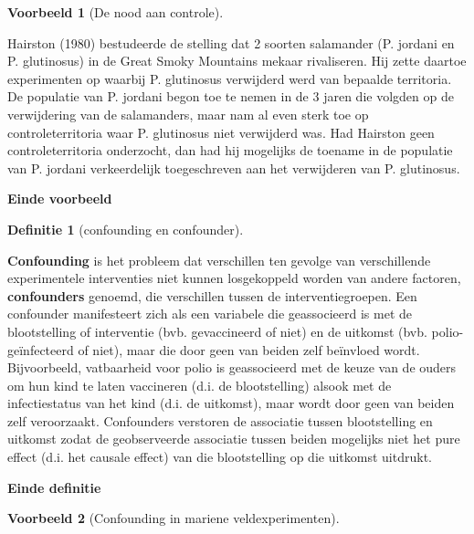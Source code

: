 \documentclass[
  12pt,dutch]{book}
\theoremstyle{definition}
\newtheorem{definition}{Definitie}[chapter]
\theoremstyle{definition}
\newtheorem{example}{Voorbeeld}[chapter]
\theoremstyle{definition}
\theoremstyle{definition}
\theoremstyle{remark}
\begin{document}
\begin{example}[De nood aan controle]
\protect\hypertarget{exm:unnamed-chunk-66}{}\label{exm:unnamed-chunk-66}~
\end{example}

Hairston (1980) bestudeerde de stelling dat 2 soorten salamander (P. jordani en P. glutinosus) in de Great Smoky Mountains mekaar rivaliseren. Hij zette daartoe experimenten op waarbij P. glutinosus verwijderd werd van bepaalde territoria. De populatie van P. jordani begon toe te nemen in de 3 jaren die volgden op de verwijdering van de salamanders, maar nam al even sterk toe op controleterritoria waar P. glutinosus niet verwijderd was. Had Hairston geen controleterritoria onderzocht, dan had hij mogelijks de toename in de populatie van P. jordani verkeerdelijk toegeschreven aan het verwijderen van P. glutinosus.

\textbf{Einde voorbeeld}

\begin{definition}[confounding en confounder]
\protect\hypertarget{def:unnamed-chunk-67}{}\label{def:unnamed-chunk-67}~
\end{definition}

\textbf{Confounding} is het probleem dat verschillen ten gevolge van verschillende experimentele interventies niet kunnen losgekoppeld worden van andere factoren, \textbf{confounders} genoemd, die verschillen tussen de interventiegroepen. Een confounder manifesteert zich als een variabele die geassocieerd
is met de blootstelling of interventie (bvb. gevaccineerd of niet) en de uitkomst (bvb.
polio-geïnfecteerd of niet), maar die door geen van beiden zelf beïnvloed wordt. Bijvoorbeeld, vatbaarheid voor polio is geassocieerd met de
keuze van de ouders om hun kind te laten vaccineren (d.i. de blootstelling)
alsook met de infectiestatus van het kind (d.i. de uitkomst), maar wordt
door geen van beiden zelf veroorzaakt. Confounders verstoren de associatie
tussen blootstelling en uitkomst zodat de geobserveerde associatie tussen
beiden mogelijks niet het pure effect (d.i. het causale effect) van die
blootstelling op die uitkomst uitdrukt.

\textbf{Einde definitie}

\begin{example}[Confounding in mariene veldexperimenten]
\protect\hypertarget{exm:unnamed-chunk-68}{}\label{exm:unnamed-chunk-68}~
\end{example}
\end{document}
